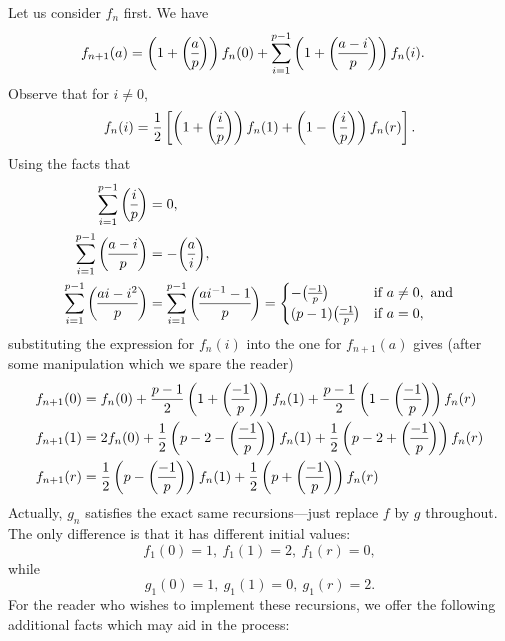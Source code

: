 Let us consider $f_n$ first. We have
\begin{align*}
	f_{n+1}(a) &= \left(1 + \legendre{a}{p}\right) f_n(0) + \sum_{i =1}^{p-1} \left(1 + \legendre{a-i}{p}\right)f_n(i) .
\end{align*}
Observe that for $i \neq 0$,
\[
	f_n(i) = \frac{1}{2}\left[\left(1 + \legendre{i}{p}\right)f_n(1) + \left(1 - \legendre{i}{p}\right) f_n(r)\right].
\]
Using the facts that
\begin{align*}
	\sum_{i=1}^{p-1} \legendre{i}{p} &= 0,\\
	\sum_{i=1}^{p-1} \legendre{a-i}{p} &= -\legendre{a}{i},\\
	\sum_{i=1}^{p-1} \legendre{ai -i^2}{p} &= \sum_{i=1}^{p-1} \legendre{ai^{-1} - 1}{p} = \begin{cases}
		-\legendre{-1}{p} & \text{if }a\neq 0, \text{ and}\\
		(p-1)\legendre{-1}{p} & \text{if }a=0,
	\end{cases}
\end{align*}
substituting the expression for $f_n(i)$ into the one for $f_{n+1}(a)$ gives (after some manipulation which we spare the reader)
\begin{align*}
	f_{n+1}(0) &= f_n(0) + \frac{p-1}{2}\left(1+\legendre{-1}{p}\right) f_n(1) + \frac{p-1}{2}\left(1-\legendre{-1}{p}\right) f_n(r)\\
	f_{n+1}(1) &= 2f_n(0) + \frac{1}{2}\left(p-2-\legendre{-1}{p}\right) f_n(1) + \frac{1}{2}\left(p-2+\legendre{-1}{p}\right) f_n(r)\\
	f_{n+1}(r) &= \frac{1}{2}\left(p-\legendre{-1}{p}\right) f_n(1) + \frac{1}{2}\left(p+\legendre{-1}{p}\right) f_n(r)
\end{align*}
Actually, $g_n$ satisfies the exact same recursions---just replace $f$ by $g$ throughout. The only difference is that it has different initial values:
\[
	f_1(0) = 1 ,\: f_1(1) = 2 ,\: f_1(r) = 0,
\]
while
\[
	g_1(0) = 1 ,\: g_1(1) = 0 ,\: g_1(r) = 2.
\]
For the reader who wishes to implement these recursions, we offer the following additional facts which may aid in the process:
